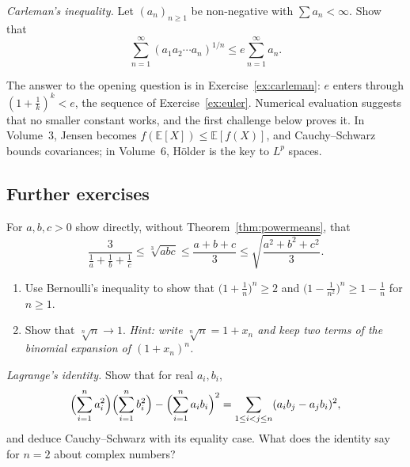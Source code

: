 \begin{exercise}[$\star\star\star$]\label{ex:carleman}
\emph{Carleman's inequality.} Let $(a_n)_{n\ge1}$ be non-negative with $\sum a_n<\infty$. Show that
\[
\sum_{n=1}^\infty\left(a_1a_2\cdots a_n\right)^{1/n}\le e\sum_{n=1}^\infty a_n.
\]
\end{exercise}

\begin{beauty}
The answer to the opening question is in Exercise~\ref{ex:carleman}: $e$ enters through $\left(1+\frac1k\right)^k<e$, the sequence of
Exercise~\ref{ex:euler}. Numerical evaluation suggests that no smaller constant works, and the first challenge below proves it. In Volume~3, Jensen becomes
$f(\mathbb E[X])\le\mathbb E[f(X)]$, and Cauchy--Schwarz bounds covariances; in Volume~6, H\"older is the key to $L^p$ spaces.
\end{beauty}

\subsection*{Further exercises}

\begin{exercise}[$\star$]\label{ex:means3}
For $a,b,c>0$ show directly, without Theorem~\ref{thm:powermeans}, that
\[
\frac3{\frac1a+\frac1b+\frac1c}\le\sqrt[3]{abc}\le\frac{a+b+c}3\le\sqrt{\frac{a^2+b^2+c^2}3}.
\]
\end{exercise}

\begin{exercise}[$\star$]\label{ex:bernoulli}
\begin{enumerate}[label=(\alph*)]
\item Use Bernoulli's inequality to show that $\bigl(1+\frac1n\bigr)^n\ge2$ and $\bigl(1-\frac1{n^2}\bigr)^n\ge1-\frac1n$ for $n\ge1$.
\item Show that $\sqrt[n]n\to1$. \emph{Hint: write $\sqrt[n]n=1+x_n$ and keep two terms of the binomial expansion of $(1+x_n)^n$.}
\end{enumerate}
\end{exercise}

\begin{exercise}[$\star\star$]\label{ex:lagrangeid}
\emph{Lagrange's identity.} Show that for real $a_i,b_i$,
\[
\Bigl(\sum_{i=1}^na_i^2\Bigr)\Bigl(\sum_{i=1}^nb_i^2\Bigr)-\Bigl(\sum_{i=1}^na_ib_i\Bigr)^2=\sum_{1\le i<j\le n}(a_ib_j-a_jb_i)^2,
\]
and deduce Cauchy--Schwarz with its equality case. What does the identity say for $n=2$ about complex numbers?
\end{exercise}

